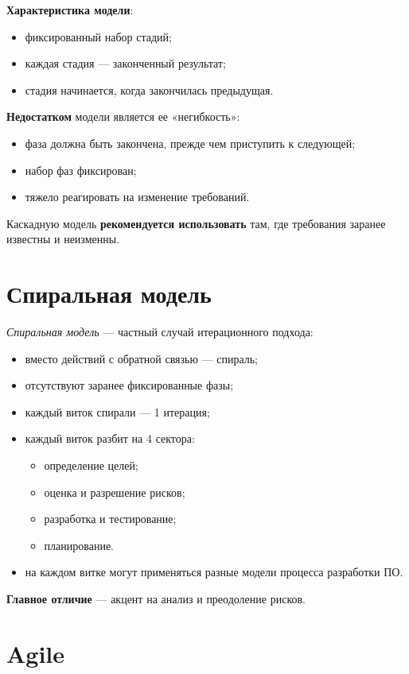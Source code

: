 \documentclass[a4paper,12pt,oneside]{extbook}
\begin{document}
\textbf{Характеристика модели}:
\begin{itemize}
    \item фиксированный набор стадий;
    \item каждая стадия — законченный результат;
    \item стадия начинается, когда закончилась предыдущая.
\end{itemize}

\textbf{Недостатком} модели является ее «негибкость»:
\begin{itemize}
    \item фаза должна быть закончена, прежде чем приступить к следующей;
    \item набор фаз фиксирован;
    \item тяжело реагировать на изменение требований.
\end{itemize}

Каскадную модель \textbf{рекомендуется использовать} там, где требования заранее
известны и неизменны.

\section{Спиральная модель}%
\label{sec:Спиральная модель}

\textit{Спиральная модель} — частный случай итерационного подхода:
\begin{itemize}
    \item вместо действий с обратной связью — спираль;
    \item отсутствуют заранее фиксированные фазы;
    \item каждый виток спирали — 1 итерация;
    \item каждый виток разбит на 4 сектора:
          \begin{itemize}
              \item определение целей;
              \item оценка и разрешение рисков;
              \item разработка и тестирование;
              \item планирование.
          \end{itemize}
    \item на каждом витке могут применяться разные модели процесса разработки ПО.
\end{itemize}

\textbf{Главное отличие} — акцент на анализ и преодоление рисков.

\section{Agile}%
\label{sec:Agile}
\end{document}
